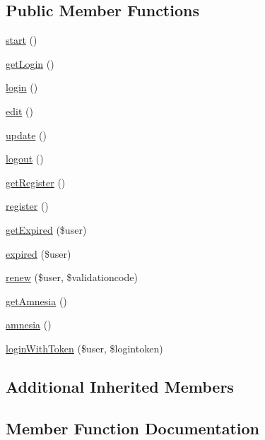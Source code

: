 \subsection*{Public Member Functions}
\begin{DoxyCompactItemize}
\item 
\hyperlink{class_user_controller_af8fa59992209e36dccb3eefb0f75531f}{start} ()
\item 
\hyperlink{class_user_controller_a827998aa84c36eb4260c248cd4797e9b}{get\+Login} ()
\item 
\hyperlink{class_user_controller_aa311da27ba5706f5710cea7706c8eae1}{login} ()
\item 
\hyperlink{class_user_controller_a5cb75cbb16467eb1768837d126dc535b}{edit} ()
\item 
\hyperlink{class_user_controller_a842e4774e3b3601a005b995c02f7e883}{update} ()
\item 
\hyperlink{class_user_controller_a082405d89acd6835c3a7c7a08a7adbab}{logout} ()
\item 
\hyperlink{class_user_controller_a305da1141ea3140bfb32f71116fa74a0}{get\+Register} ()
\item 
\hyperlink{class_user_controller_acc294a6cc8e69743746820e3d15e3f78}{register} ()
\item 
\hyperlink{class_user_controller_ab4785f8d9c5c79b3ab572925f2f97306}{get\+Expired} (\$user)
\item 
\hyperlink{class_user_controller_a438fd5ec50539017c7a451cd24314136}{expired} (\$user)
\item 
\hyperlink{class_user_controller_ab5e63fe8a442e0111ff5d8d5a2094b6a}{renew} (\$user, \$validationcode)
\item 
\hyperlink{class_user_controller_a4a45837bec70bc19454236967e505aeb}{get\+Amnesia} ()
\item 
\hyperlink{class_user_controller_afe734f22aa89fda90b587800b342eaf5}{amnesia} ()
\item 
\hyperlink{class_user_controller_ad1953cd478f001115b9d273a37df5155}{login\+With\+Token} (\$user, \$logintoken)
\end{DoxyCompactItemize}
\subsection*{Additional Inherited Members}


\subsection{Member Function Documentation}
\hypertarget{class_user_controller_afe734f22aa89fda90b587800b342eaf5}{}
